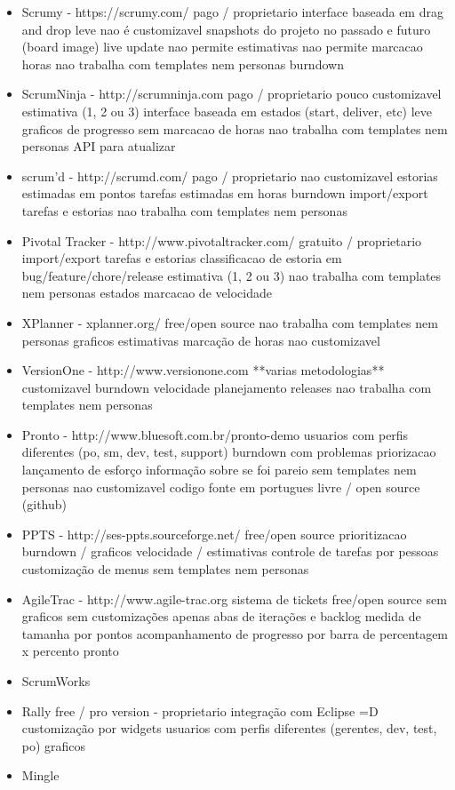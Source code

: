 \begin{itemize}
\item Scrumy - https://scrumy.com/
pago / proprietario
interface baseada em drag and drop
leve
nao é customizavel
snapshots do projeto no passado e futuro (board image)
live update
nao permite estimativas
nao permite marcacao horas
nao trabalha com templates nem personas
burndown

\item ScrumNinja - http://scrumninja.com
pago / proprietario
pouco customizavel
estimativa (1, 2 ou 3)
interface baseada em estados (start, deliver, etc)
leve
graficos de progresso
sem marcacao de horas
nao trabalha com templates nem personas
API para atualizar

\item scrum'd - http://scrumd.com/
pago / proprietario
nao customizavel
estorias estimadas em pontos
tarefas estimadas em horas
burndown
import/export tarefas e estorias
nao trabalha com templates nem personas


\item Pivotal Tracker - http://www.pivotaltracker.com/
gratuito / proprietario
import/export tarefas e estorias
classificacao de estoria em bug/feature/chore/release
estimativa (1, 2 ou 3)
nao trabalha com templates nem personas
estados
marcacao de velocidade

\item XPlanner - xplanner.org/
free/open source
nao trabalha com templates nem personas
graficos
estimativas
marcação de horas
nao customizavel

\item VersionOne - http://www.versionone.com
**varias metodologias**
customizavel
burndown
velocidade
planejamento releases
nao trabalha com templates nem personas

\item Pronto - http://www.bluesoft.com.br/pronto-demo
usuarios com perfis diferentes (po, sm, dev, test, support)
burndown com problemas
priorizacao
lançamento de esforço
informação sobre se foi pareio
sem templates nem personas
nao customizavel
codigo fonte em portugues
livre / open source (github)

\item PPTS - http://ses-ppts.sourceforge.net/
free/open source
prioritizacao
burndown / graficos
velocidade / estimativas
controle de tarefas por pessoas
customização de menus
sem templates nem personas

\item AgileTrac - http://www.agile-trac.org
sistema de tickets
free/open source
sem graficos
sem customizações
apenas abas de iterações e backlog
medida de tamanha por pontos
acompanhamento de progresso por barra de percentagem x percento pronto

\item ScrumWorks

\item Rally
free / pro version - proprietario
integração com Eclipse =D
customização por widgets
usuarios com perfis diferentes (gerentes, dev, test, po)
graficos

\item Mingle

\end{itemize}

